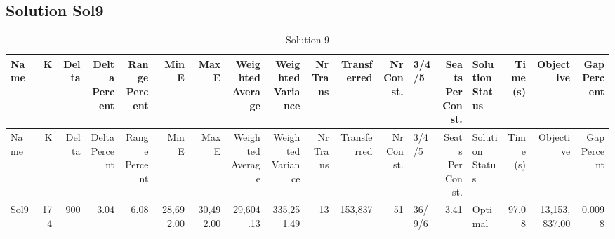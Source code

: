 \documentclass[a4paper]{article}
\begin{document}
\clearpage
\subsection{Solution Sol9}

{\scriptsize
\begin{longtable}{lrrrrrrrrrrrlrlrrr}
\caption{Solution 9}
\\ \toprule
Name &K &Delta &\shortstack{Delta\\Percent} &\shortstack{Range\\Percent} &Min E &Max E &\shortstack{Weighted\\Average} &\shortstack{Weighted\\Variance} &\shortstack{Nr\\Trans} &Transferred &\shortstack{Nr\\Const.} &3/4/5 &\shortstack{Seats\\Per\\Const.} &\shortstack{Solution\\Status} &\shortstack{Time\\(s)} &Objective &\shortstack{Gap\\Percent} \\ \midrule
\endfirsthead
\toprule
Name &K &Delta &\shortstack{Delta\\Percent} &\shortstack{Range\\Percent} &Min E &Max E &\shortstack{Weighted\\Average} &\shortstack{Weighted\\Variance} &\shortstack{Nr\\Trans} &Transferred &\shortstack{Nr\\Const.} &3/4/5 &\shortstack{Seats\\Per\\Const.} &\shortstack{Solution\\Status} &\shortstack{Time\\(s)} &Objective &\shortstack{Gap\\Percent} \\ \midrule
\endhead
\bottomrule
\endfoot
Sol9&174&900& 3.04& 6.08&28,692.00&30,492.00&29,604.13&335,251.49&13&153,837&51&36/9/6& 3.41&Optimal&97.08&13,153,837.00&0.0098\\ 
\end{longtable}

}
\end{document}
